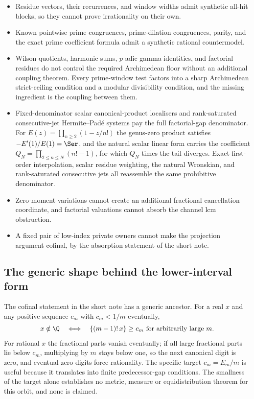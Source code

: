 \begin{itemize}
\item Residue vectors, their recurrences, and window widths admit synthetic
  all-hit blocks, so they cannot prove irrationality on their own.
\item Known pointwise prime congruences, prime-dilation congruences, parity,
  and the exact prime coefficient formula admit a synthetic rational
  countermodel.
\item Wilson quotients, harmonic sums, $p$-adic gamma identities, and
  factorial residues do not control the required Archimedean floor without an
  additional coupling theorem.  Every prime-window test factors into a sharp
  Archimedean strict-ceiling condition and a modular divisibility condition,
  and the missing ingredient is the coupling between them.
\item Fixed-denominator scalar canonical-product localisers and
  rank-saturated consecutive-jet Hermite--Pad\'e systems pay the full
  factorial-gap denominator.  For $E(z)=\prod_{n\ge2}(1-z/n!)$ the genus-zero
  product satisfies $-E'(1)/E(1)=\Ser$, and the natural scalar linear form
  carries the coefficient $Q_N=\prod_{2\le n\le N}(n!-1)$, for which $Q_N$
  times the tail diverges.  Exact first-order interpolation, scalar residue
  weighting, the natural Wronskian, and rank-saturated consecutive jets all
  reassemble the same prohibitive denominator.
\item Zero-moment variations cannot create an additional fractional
  cancellation coordinate, and factorial valuations cannot absorb the channel
  lcm obstruction.
\item A fixed pair of low-index private owners cannot make the projection
  argument cofinal, by the absorption statement of the short note.
\end{itemize}

\subsection{The generic shape behind the lower-interval form}
\label{long68:sec:ext-generic}

The cofinal statement in the short note has a generic ancestor.  For a real
$x$ and any positive sequence $c_m$ with $c_m<1/m$ eventually,
\[
 x\notin\Q
 \quad\Longleftrightarrow\quad
 \{(m-1)!\,x\}\ge c_m\ \hbox{for arbitrarily large }m .
\]
For rational $x$ the fractional parts vanish eventually; if all large
fractional parts lie below $c_m$, multiplying by $m$ stays below one, so the
next canonical digit is zero, and eventual zero digits force rationality.
The specific target $c_m=E_m/m$ is useful because it translates into finite
predecessor-gap conditions.  The smallness of the target alone establishes no
metric, measure or equidistribution theorem for this orbit, and none is
claimed.
